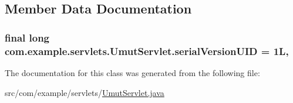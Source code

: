 \subsection{Member Data Documentation}
\subsubsection[{\texorpdfstring{serial\+Version\+U\+ID}{serialVersionUID}}]{\setlength{\rightskip}{0pt plus 5cm}final long com.\+example.\+servlets.\+Umut\+Servlet.\+serial\+Version\+U\+ID = 1L\hspace{0.3cm}{\ttfamily [static]}, {\ttfamily [private]}}\hypertarget{classcom_1_1example_1_1servlets_1_1_umut_servlet_a2ac8210ed285393de2a441e311db1ea5}{}\label{classcom_1_1example_1_1servlets_1_1_umut_servlet_a2ac8210ed285393de2a441e311db1ea5}


The documentation for this class was generated from the following file\+:\begin{DoxyCompactItemize}
\item 
src/com/example/servlets/\hyperlink{_umut_servlet_8java}{Umut\+Servlet.\+java}\end{DoxyCompactItemize}
